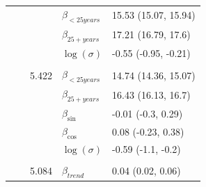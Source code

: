 \documentclass[a4paper,twoside,11pt]{report} %
\theoremstyle{definition}
\theoremstyle{definition}
\theoremstyle{definition}
\theoremstyle{definition}
\theoremstyle{remark}
\begin{document}
\begin{longtable}[t]{llrll}
\hspace{1em}\hspace{1em} &  &  & $\beta_{<25 years}$ & 15.53 (15.07, 15.94)\\

\hspace{1em}\hspace{1em} &  &  & $\beta_{25+ years}$ & 17.21 (16.79, 17.6)\\

\hspace{1em}\hspace{1em} &  &  & $\log(\sigma)$ & -0.55 (-0.95, -0.21)\\
\cmidrule{2-5}
\addlinespace[0.3em]
\multicolumn{5}{l}{\begin{math}\log(\lambda_{it})=\beta(ageGroup_{i})+\beta_{\sin}\sin\Big(\frac{\pi\cdot \tau_{t}}{6}\Big) + \beta_{\cos} \cos\Big(\frac{\pi \cdot \tau_{t}}{6}\Big)+\log(n_{it})\end{math}}\\
\hspace{1em}\hspace{1em} &  & 5.422 & $\beta_{<25 years}$ & 14.74 (14.36, 15.07)\\

\hspace{1em}\hspace{1em} &  &  & $\beta_{25+ years}$ & 16.43 (16.13, 16.7)\\

\hspace{1em}\hspace{1em} &  &  & $\beta_{\sin}$ & -0.01 (-0.3, 0.29)\\

\hspace{1em}\hspace{1em} &  &  & $\beta_{\cos}$ & 0.08 (-0.23, 0.38)\\

\hspace{1em}\hspace{1em} &  &  & $\log(\sigma)$ & -0.59 (-1.1, -0.2)\\
\cmidrule{2-5}
\addlinespace[0.3em]
\multicolumn{5}{l}{\begin{math}\log(\lambda_{it})=\beta(ageGroup_{i})+\beta_{trend} t + \beta_{\sin} \sin\Big(\frac{\pi\cdot \tau_{t}}{6}\Big) + \beta_{\cos} \cos\Big(\frac{\pi \cdot \tau_{t}}{6}\Big)+\log(n_{it})\end{math}}\\
\hspace{1em}\hspace{1em} &  & 5.084 & $\beta_{trend}$ & 0.04 (0.02, 0.06)\\


\end{longtable}
\end{document}
